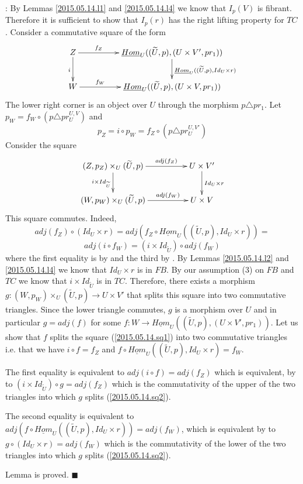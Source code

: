 \documentclass[12pt]{article}
\numberwithin{equation}{section}
\newenvironment{eq}{\begin{equation}}{\end{equation}}
\newenvironment{myproof}{{\bf Proof}:}{$\blacksquare$ \vskip 5mm }
\newcommand{\llabel}[1]{\label{#1}}
\newcommand{\sr}{\rightarrow}
\newcommand{\uu}{\underline}
\newcommand{\wt}{\widetilde}
\begin{document}
\begin{myproof}
By Lemmas \ref{2015.05.14.l1} and \ref{2015.05.14.l4} we know that $I_p(V)$ is
fibrant. Therefore it is sufficient to show that $I_p(r)$ has the right lifting
property for $TC$. Consider a commutative square of the form
%
\begin{eq}
\llabel{2015.05.14.sq1}
\begin{xy}
          \xymatrix@C=4pc{ Z \ar[r]^-{f_Z} \ar[d]_{i} &
            \uu{Hom}_U((\wt{U},p),(U\times V',pr_1))
            \ar[d]^{\uu{Hom}_U((\wt{U},p), Id_U\times r)}\\ W \ar[r]^-{f_W} &
            \uu{Hom}_U((\wt{U},p), (U\times V, pr_1)) }
\end{xy}
\end{eq}
%
The lower right corner is an object over $U$ through the morphism $p\triangle
pr_1$. Let $p_W=f_W\circ (p\triangle pr^{U,V}_U)$ and
%
$$p_Z=i\circ p_W=f_Z\circ (p\triangle pr^{U,V'}_U)$$
%
Consider the square
%
\begin{eq}
\llabel{2015.05.14.sq2}
\begin{xy}
          \xymatrix@C=4pc{ (Z,p_Z)\times_U (\wt{U},p) \ar[r]^-{adj(f_Z)}
            \ar[d]_{i\times Id_{\wt{U}}} & U\times V' \ar[d]^{Id_U\times
              r}\\ (W,p_W)\times_U (\wt{U},p) \ar[r]^-{adj(f_W)} & U\times V }
\end{xy}
\end{eq}
%
This square commutes. Indeed,
%
$$adj(f_Z)\circ (Id_U\times r )=adj(f_Z\circ \uu{Hom}_U((\wt{U},p), Id_U\times
r))=$$
$$adj(i\circ f_W)=(i\times Id_{\wt{U}})\circ adj (f_W)$$
%
where the first equality is by \cite[Lemma 8.7(1)]{fromunivwithPi} and the
third by \cite[Lemma 8.7(3)]{fromunivwithPi}. By Lemmas \ref{2015.05.14.l2} and
\ref{2015.05.14.l4} we know that $Id_U\times r$ is in $FB$. By our assumption
(3) on $FB$ and $TC$ we know that $i\times Id_{\wt{U}}$ is in $TC$. Therefore,
there exists a morphism $g:(W,p_W)\times_U (\wt{U},p) \sr U\times V'$ that
splits this square into two commutative triangles. Since the lower triangle
commutes, $g$ is a morphism over $U$ and in particular $g=adj(f)$ for some
$f:W\sr \uu{Hom}_U((\wt{U},p),(U\times V',pr_1))$. Let us show that $f$ splits
the square (\ref{2015.05.14.sq1}) into two commutative triangles i.e. that we
have $i\circ f= f_Z$ and $f\circ \uu{Hom}_U((\wt{U},p), Id_U\times r)=f_W$.

The first equality is equivalent to $adj(i\circ f)=adj(f_Z)$ which is
equivalent, by \cite[Lemma 8.7(3)]{fromunivwithPi} to $(i\times
Id_{\wt{U}})\circ g=adj(f_Z)$ which is the commutativity of the upper of the
two triangles into which $g$ splits (\ref{2015.05.14.sq2}).

The second equality is equivalent to $adj(f\circ \uu{Hom}_U((\wt{U},p),
Id_U\times r))=adj(f_W)$, which is equivalent by \cite[Lemma
  8.7(1)]{fromunivwithPi} to $g\circ (Id_U\times r)=adj(f_W)$ which is the
commutativity of the lower of the two triangles into which $g$ splits
(\ref{2015.05.14.sq2}).

Lemma is proved.
\end{myproof}
\end{document}
